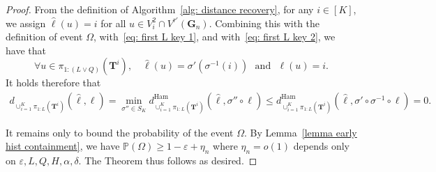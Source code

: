 \documentclass[twoside,11pt]{article}
\theoremstyle{remark}
\begin{document}
\begin{proof}
From the definition of Algorithm~\ref{alg: distance recovery}, for any $i \in [K]$, we assign $\hat{\ell}(u) = i$ for all $u \in V_i^2 \cap V^{\tau'}(\bm{G}_n)$. Combining this with the definition of event $\Omega$, with~\eqref{eq: first L key 1}, and with~\eqref{eq: first L key 2}, we have that 
\[
\forall u \in \pi_{1:(L \vee Q)}(\bm{T}^i), \quad \hat{\ell}(u) = \sigma' (\sigma^{-1}(i)) \,\, \text{ and } \,\, \ell(u) = i.
\]
It holds therefore that
\begin{align*}
   d_{\cup_{i=1}^K \pi_{1:L}\left(\bm{T}^i\right)}(\hat{\ell}, \ell) 
   = 
   \min_{\sigma'' \in S_K} d_{\cup_{i=1}^K \pi_{1:L}\left(\bm{T}^i\right)}^{\text{Ham}}\left(\hat{\ell},\sigma'' \circ \ell\right)
   \le  
   d_{\cup_{i=1}^K \pi_{1:L}\left(\bm{T}^i\right)}^{\text{Ham}}\left(\hat{\ell},\sigma' \circ \sigma^{-1} \circ \ell\right)
   =0.
\end{align*}

It remains only to bound the probability of the event $\Omega$. By Lemma~\ref{lemma early hist containment}, we have $\mathbb{P}(\Omega) \geq 1 - \varepsilon + \eta_n$ where $\eta_n=o(1)$ depends only on $\varepsilon, L, Q, H, \alpha, \delta$. The Theorem thus follows as desired. 

\end{proof}




\end{document}
